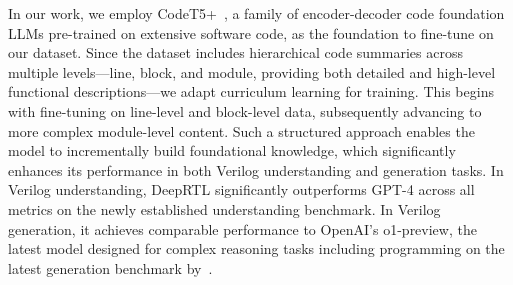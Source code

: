 In our work, we employ CodeT5+~\citep{wang2023codet5+}, a family of encoder-decoder code foundation LLMs pre-trained on extensive software code, as the foundation to fine-tune on our dataset. 
Since the dataset includes hierarchical code summaries across multiple levels—line, block, and module, providing both detailed and high-level functional descriptions—we adapt curriculum learning for training.
This begins with fine-tuning on line-level and block-level data, subsequently advancing to more complex module-level content. Such a structured approach enables the model to incrementally build foundational knowledge, which significantly enhances its performance in both Verilog understanding and generation tasks.
In Verilog understanding, DeepRTL significantly outperforms GPT-4 across all metrics on the newly established understanding benchmark. In Verilog generation, it achieves comparable performance to OpenAI's o1-preview, the latest model designed for complex reasoning tasks including programming on the latest generation benchmark by~\citet{chang2024natural}.